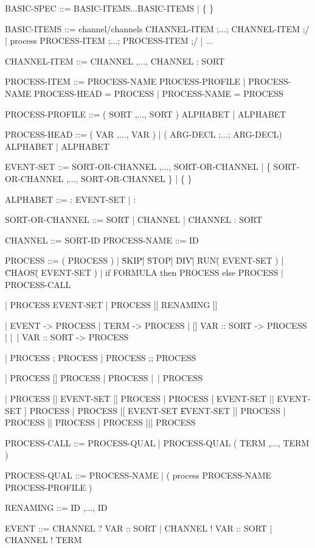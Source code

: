 BASIC-SPEC      ::= BASIC-ITEMS...BASIC-ITEMS
                  | \{ \}

BASIC-ITEMS     ::= channel/channels CHANNEL-ITEM ;...; CHANNEL-ITEM ;/
                  | process PROCESS-ITEM ;...; PROCESS-ITEM ;/
                  | ...  %

CHANNEL-ITEM    ::= CHANNEL ,..., CHANNEL : SORT

PROCESS-ITEM    ::= PROCESS-NAME PROCESS-PROFILE    %
                  | PROCESS-NAME PROCESS-HEAD = PROCESS
                  | PROCESS-NAME = PROCESS

PROCESS-PROFILE ::= ( SORT ,..., SORT ) ALPHABET
                  | ALPHABET

PROCESS-HEAD    ::= ( VAR ,..., VAR )              %
                  | ( ARG-DECL ;...; ARG-DECL) ALPHABET
                  | ALPHABET

EVENT-SET       ::= SORT-OR-CHANNEL ,..., SORT-OR-CHANNEL
                  | \{ SORT-OR-CHANNEL ,..., SORT-OR-CHANNEL \}
                  | \{ \}   %

ALPHABET        ::= : EVENT-SET
                  | :       %

SORT-OR-CHANNEL ::= SORT
                  | CHANNEL
                  | CHANNEL : SORT

CHANNEL         ::= SORT-ID
PROCESS-NAME    ::= ID

PROCESS   ::= ( PROCESS )                   %
            | \"SKIP\"
            | \"STOP\"
            | \"DIV\"
            | \"RUN\" ( EVENT-SET )
            | \"CHAOS\" ( EVENT-SET )
            | if FORMULA then PROCESS else PROCESS
            | PROCESS-CALL

            | PROCESS \back EVENT-SET       %
            | PROCESS [[ RENAMING ]]

            | EVENT -> PROCESS
            | TERM -> PROCESS
            | [] VAR :: SORT -> PROCESS     %
            | |~| VAR :: SORT -> PROCESS

            | PROCESS ; PROCESS
            | PROCESS ;; PROCESS %

            | PROCESS [] PROCESS            %
            | PROCESS |~| PROCESS

            | PROCESS [| EVENT-SET |] PROCESS             %
            | PROCESS [ EVENT-SET || EVENT-SET ] PROCESS  %
            | PROCESS |[ EVENT-SET \| EVENT-SET ]| PROCESS %
            | PROCESS || PROCESS                          %
            | PROCESS ||| PROCESS                         %

PROCESS-CALL    ::= PROCESS-QUAL
                  | PROCESS-QUAL ( TERM ,..., TERM )

PROCESS-QUAL    ::= PROCESS-NAME
                  | ( process PROCESS-NAME PROCESS-PROFILE )

RENAMING        ::= ID ,..., ID       %

EVENT           ::= CHANNEL ? VAR :: SORT
                  | CHANNEL ! VAR :: SORT
                  | CHANNEL ! TERM

